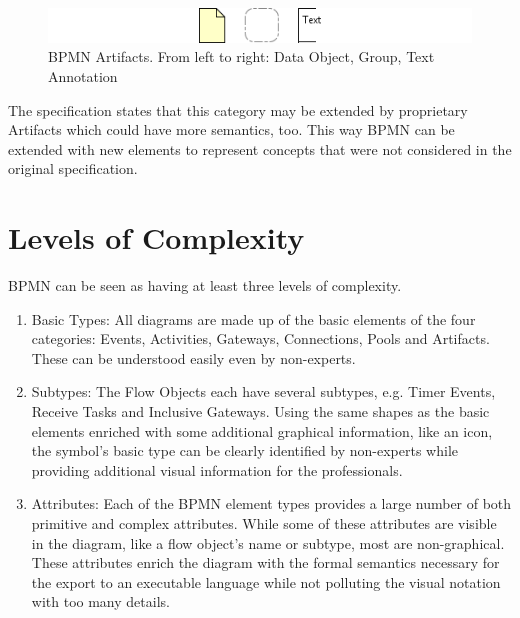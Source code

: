 \begin{figure}[ht]
	\centering
	\includegraphics[width=.75\textwidth]{figures/bpmn/artifacts.png}
	\caption[BPMN Artifacts]{BPMN Artifacts.  From left to right: Data Object,
	Group, Text Annotation}
	\label{fig:artifacts}
\end{figure}

The specification states that this category may be extended by proprietary
Artifacts which could have more semantics, too.  This way BPMN can be extended
with new elements to represent concepts that were not considered in the original
specification.



\section{Levels of Complexity}
\label{sec:bpmn_complexity}

BPMN can be seen as having at least three levels of complexity.

\begin{enumerate}
	\item Basic Types: All diagrams are made up of the basic elements of the four
	categories: Events, Activities, Gateways, Connections, Pools and Artifacts.
	These can be understood easily even by non-experts.
	
	\item Subtypes: The Flow Objects each have several subtypes, e.g.  Timer
	Events, Receive Tasks and Inclusive Gateways.  Using the same shapes as the
	basic elements enriched with some additional graphical information, like an
	icon, the symbol's basic type can be clearly identified by non-experts while
	providing additional visual information for the professionals.
	
	\item Attributes: Each of the BPMN element types provides a large number of
	both primitive and complex attributes.  While some of these attributes are
	visible in the diagram, like a flow object's name or subtype, most are
	non-graphical.  These attributes enrich the diagram with the formal semantics
	necessary for the export to an executable language while not polluting the
	visual notation with too many details.
\end{enumerate}

